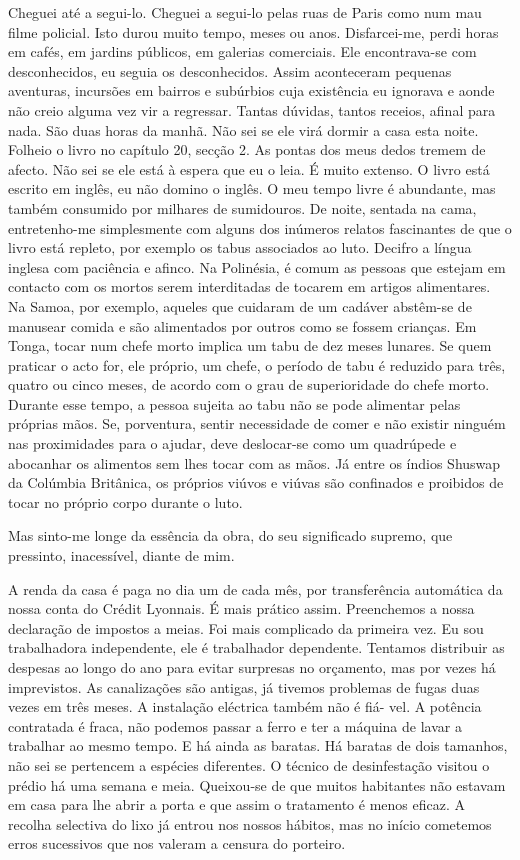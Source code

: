 Cheguei até a segui-lo. Cheguei a segui-lo pelas ruas de Paris como num
mau filme policial. Isto durou muito tempo, meses ou anos. Disfarcei-me,
perdi horas em cafés, em jardins públicos, em galerias comerciais. Ele
encontrava-se com desconhecidos, eu seguia os desconhecidos. Assim
aconteceram pequenas aventuras, incursões em bairros e subúrbios cuja existência
eu ignorava e aonde não creio alguma vez vir a regressar. Tantas
dúvidas, tantos receios, afinal para nada. São duas horas da manhã. Não
sei se ele virá dormir a casa esta noite. Folheio o livro no capítulo
20, secção 2. As pontas dos meus dedos tremem de afecto. Não sei se ele
está à espera que eu o leia. É muito extenso. O livro está escrito em
inglês, eu não domino o inglês. O meu tempo livre é abundante, mas
também consumido por milhares de sumidouros. De noite, sentada na cama,
entretenho-me simplesmente com alguns dos inúmeros relatos fascinantes
de que o livro está repleto, por exemplo os tabus associados ao luto.
Decifro a língua inglesa com paciência e afinco. Na Polinésia, é comum
as pessoas que estejam em contacto com os mortos serem interditadas de
tocarem em artigos alimentares. Na Samoa, por exemplo, aqueles que
cuidaram de um cadáver abstêm-se de manusear comida e são alimentados
por outros como se fossem crianças. Em Tonga, tocar num chefe morto
implica um tabu de dez meses lunares. Se quem praticar o acto for, ele
próprio, um chefe, o período de tabu é reduzido para três, quatro ou
cinco meses, de acordo com o grau de superioridade do chefe morto.
Durante esse tempo, a pessoa sujeita ao tabu não se pode alimentar pelas
próprias mãos. Se, porventura, sentir necessidade de comer e não
existir ninguém nas proximidades para o ajudar, deve deslocar-se como um
quadrúpede e abocanhar os alimentos sem lhes tocar com as mãos. Já entre
os índios Shuswap da Colúmbia Britânica, os próprios viúvos e viúvas são
confinados e proibidos de tocar no próprio corpo durante o luto.

Mas sinto-me longe da essência da obra, do seu significado
supremo, que pressinto, inacessível, diante de mim.


A renda da casa é paga no dia um de cada mês, por transferência
automática da nossa conta do Crédit Lyonnais. É mais prático assim.
Preenchemos a nossa declaração de impostos a meias. Foi mais
complicado da primeira vez. Eu sou trabalhadora independente, ele é
trabalhador dependente. Tentamos distribuir as despesas ao longo do ano
para evitar surpresas no orçamento, mas por vezes há imprevistos. As
canalizações são antigas, já tivemos problemas de fugas duas vezes em
três meses. A instalação eléctrica também não é fiá- vel. A potência
contratada é fraca, não podemos passar a ferro e ter a máquina de lavar
a trabalhar ao mesmo tempo. E há ainda as baratas. Há baratas de dois
tamanhos, não sei se pertencem a espécies diferentes. O técnico de
desinfestação visitou o prédio há uma semana e meia. Queixou-se de que
muitos habitantes não estavam em casa para lhe abrir a porta e que assim
o tratamento é menos eficaz. A recolha selectiva do lixo já entrou nos
nossos hábitos, mas no início cometemos erros sucessivos que nos valeram
a censura do porteiro.

